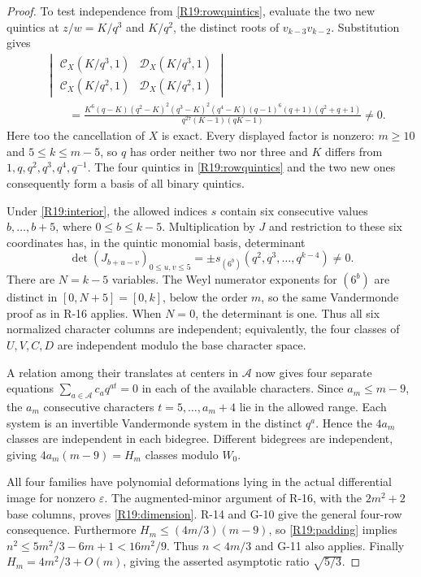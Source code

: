 \begin{proof}
To test independence from \eqref{R19:rowquintics},
evaluate the two new quintics at
$z/w=K/q^3$ and $K/q^2$, the distinct roots of
$v_{k-3}v_{k-2}$. Substitution gives
\begin{equation}\label{R19:evaldet}
\begin{aligned}
 &\begin{vmatrix}
 \mathcal C_X(K/q^3,1)&\mathcal D_X(K/q^3,1)\\
 \mathcal C_X(K/q^2,1)&\mathcal D_X(K/q^2,1)
 \end{vmatrix}\\
 &\qquad=
 \frac{K^6(q-K)(q^2-K)^2(q^3-K)^2(q^4-K)
             (q-1)^6(q+1)(q^2+q+1)}
      {q^{27}(K-1)(qK-1)}\ne0.
\end{aligned}
\end{equation}
Here too the cancellation of $X$ is exact.
Every displayed factor is nonzero: $m\geq10$ and
$5\leq k\leq m-5$, so $q$ has order neither two nor
three and $K$ differs from $1,q,q^2,q^3,q^4,q^{-1}$.
The four quintics in \eqref{R19:rowquintics} and the
two new ones consequently form a basis of all binary
quintics.

Under \eqref{R19:interior}, the allowed indices $s$
contain six consecutive values $b,\ldots,b+5$, where
$0\leq b\leq k-5$. Multiplication by $J$ and restriction
to these six coordinates has, in the quintic monomial
basis, determinant
\[
 \det(J_{b+u-v})_{0\leq u,v\leq5}
   =\pm s_{(6^b)}(q^2,q^3,\ldots,q^{k-4})\ne0.
\]
There are $N=k-5$ variables. The Weyl numerator
exponents for $(6^b)$ are distinct in
$[0,N+5]=[0,k]$, below the order $m$, so the same
Vandermonde proof as in R-16 applies. When $N=0$,
the determinant is one. Thus all six normalized
character columns are independent; equivalently,
the four classes of $U,V,C,D$ are independent modulo
the base character space.

A relation among their translates at centers in
$\mathcal A$ now gives four separate equations
$\sum_{a\in\mathcal A}c_aq^{at}=0$ in each of the
available characters. Since $a_m\leq m-9$, the
$a_m$ consecutive characters
$t=5,\ldots,a_m+4$ lie in the allowed range.
Each system is an invertible Vandermonde system in
the distinct $q^a$. Hence the $4a_m$ classes are
independent in each bidegree. Different bidegrees
are independent, giving $4a_m(m-9)=H_m$ classes
modulo $W_0$.

All four families have polynomial deformations lying
in the actual differential image for nonzero
$\varepsilon$. The augmented-minor argument of
R-16, with the $2m^2+2$ base columns, proves
\eqref{R19:dimension}.
R-14 and G-10 give the general four-row consequence.
Furthermore $H_m\leq(4m/3)(m-9)$, so
\eqref{R19:padding} implies
$n^2\leq5m^2/3-6m+1<16m^2/9$.
Thus $n<4m/3$ and G-11 also applies.
Finally $H_m=4m^2/3+O(m)$, giving the asserted
asymptotic ratio $\sqrt{5/3}$.
\end{proof}


